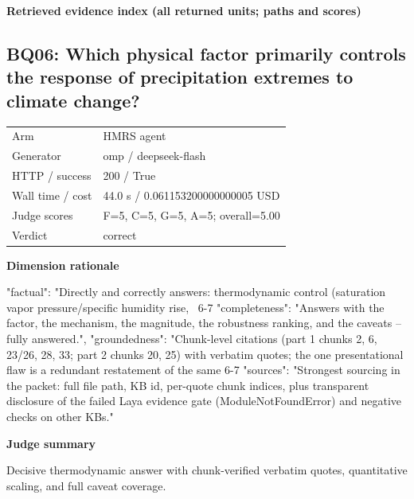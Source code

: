 \documentclass[10pt]{article}
\begin{document}
\textbf{Retrieved evidence index (all returned units; paths and scores) }
\begin{EvidenceText}
\end{EvidenceText}
\subsection{BQ06: Which physical factor primarily controls the response of precipitation extremes to climate change?}
\begin{tabular}{@{}ll@{}}
Arm & HMRS agent\\
Generator & omp / deepseek-flash\\
HTTP / success & 200 / True\\
Wall time / cost & 44.0 s / 0.061153200000000005 USD\\
Judge scores & F=5, C=5, G=5, A=5; overall=5.00\\
Verdict & correct\\
\end{tabular}

\textbf{Dimension rationale}
\begin{EvidenceText}
{
  "factual": "Directly and correctly answers: thermodynamic control (saturation vapor pressure/specific humidity rise, ~6-7%
  "completeness": "Answers with the factor, the mechanism, the magnitude, the robustness ranking, and the caveats -- fully answered.",
  "groundedness": "Chunk-level citations (part 1 chunks 2, 6, 23/26, 28, 33; part 2 chunks 20, 25) with verbatim quotes; the one presentational flaw is a redundant restatement of the same 6-7%
  "sources": "Strongest sourcing in the packet: full file path, KB id, per-quote chunk indices, plus transparent disclosure of the failed Laya evidence gate (ModuleNotFoundError) and negative checks on other KBs."
}
\end{EvidenceText}

\textbf{Judge summary}
\begin{EvidenceText}
Decisive thermodynamic answer with chunk-verified verbatim quotes, quantitative scaling, and full caveat coverage.
\end{EvidenceText}
\end{document}
